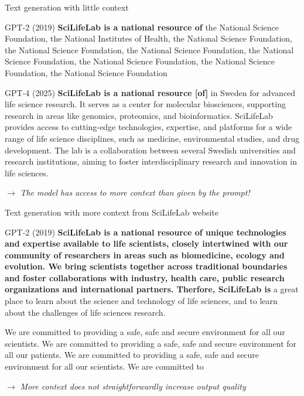 \documentclass[10pt]{beamer}
\newcommand{\remark}[1]{{\par \color{scGrape} \ensuremath{\rightarrow} \emph{#1}}}
\begin{document}
\begin{frame}{Text generation with little context}
		
	\begin{alertblock}{GPT-2 (2019) }
		\small
			\textbf{SciLifeLab is a national resource of} the National Science Foundation, the National Institutes of Health, the National Science Foundation, the National Science Foundation, the National Science Foundation, the National Science Foundation, the National Science Foundation, the National Science Foundation, the National Science Foundation
	\end{alertblock}
		
	\begin{alertblock}{GPT-4 (2025)}
		\small
		\textbf{SciLifeLab is a national resource [of]} in Sweden for advanced life science research. It serves as a center for molecular biosciences, supporting research in areas like genomics, proteomics, and bioinformatics. SciLifeLab provides access to cutting-edge technologies, expertise, and platforms for a wide range of life science disciplines, such as medicine, environmental studies, and drug development. The lab is a collaboration between several Swedish universities and research institutions, aiming to foster interdisciplinary research and innovation in life sciences.
	\end{alertblock}
	 \remark{The model has access to more context than given by the prompt!}
\end{frame}

\begin{frame}{Text generation with more context from SciLifeLab website}
	
	\begin{alertblock}{GPT-2 (2019) }
		\small
		\textbf{SciLifeLab is a national resource of unique technologies and expertise available to life scientists, closely intertwined with our community of researchers in areas such as biomedicine, ecology and evolution. We bring scientists together across traditional boundaries and foster collaborations with industry, health care, public research organizations and international partners. Therfore, SciLifeLab is}  a great place to learn about the science and technology of life sciences, and to learn about the challenges of life sciences research.
		
		We are committed to providing a safe, safe and secure environment for all our scientists. We are committed to providing a safe, safe and secure environment for all our patients. We are committed to providing a safe, safe and secure environment for all our scientists. We are committed to
	\end{alertblock}
	
	\remark{More context does not straightforwardly increase output quality}
\end{frame}
\end{document}
